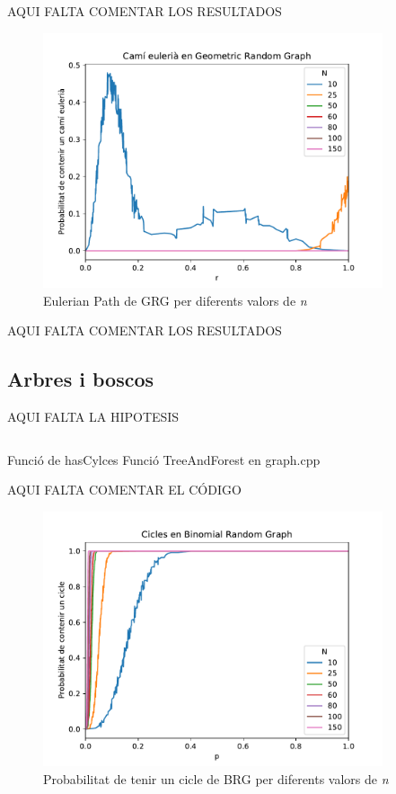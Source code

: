 AQUI FALTA COMENTAR LOS RESULTADOS

\begin{figure}[H]
    \centering
    \includegraphics[width=10cm]{plots/GRG_eulerianPath.pdf}
    \caption{Eulerian Path de GRG per diferents valors de \textit{n}}
    \label{fig:connect_04}
\end{figure}

AQUI FALTA COMENTAR LOS RESULTADOS

\subsection{Arbres i boscos}
AQUI FALTA LA HIPOTESIS

\begin{listing}
\inputminted[firstline=27,lastline=66]{cpp}{src/graph.cpp}
\caption{Funció de hasCylces Funció TreeAndForest en graph.cpp}
\end{listing}

AQUI FALTA COMENTAR EL CÓDIGO

\begin{figure}[H]
    \centering
    \includegraphics[width=10cm]{plots/BRG_cicle.pdf}
    \caption{Probabilitat de tenir un cicle de BRG per diferents valors de \textit{n}}
    \label{fig:connect_04}
\end{figure}

